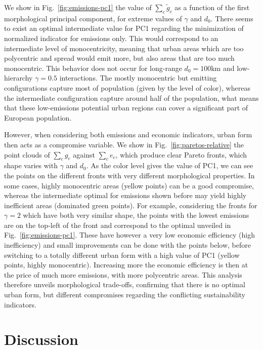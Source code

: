\documentclass{jimis-en}
\begin{document}
We show in Fig.~\ref{fig:emissions-pc1} the value of $\sum_c \tilde{g}_c$ as a function of the first morphological principal component, for extreme values of $\gamma$ and $d_0$. There seems to exist an optimal intermediate value for PC1 regarding the minimization of normalized indicator for emissions only. This would correspond to an intermediate level of monocentricity, meaning that urban areas which are too polycentric and spread would emit more, but also areas that are too much monocentric. This behavior does not occur for long-range $d_0 = 100$km and low-hierarchy $\gamma=0.5$ interactions. The mostly monocentric but emitting configurations capture most of population (given by the level of color), whereas the intermediate configuration capture around half of the population, what means that these low-emissions potential urban regions can cover a significant part of European population.


However, when considering both emissions and economic indicators, urban form then acts as a compromise variable. We show in Fig.~\ref{fig:paretos-relative} the point clouds of $\sum_c g_c$ against $\sum_c e_c$, which produce clear Pareto fronts, which shape varies with $\gamma$ and $d_0$. As the color level gives the value of PC1, we can see the points on the different fronts with very different morphological properties. In some cases, highly monocentric areas (yellow points) can be a good compromise, whereas the intermediate optimal for emissions shown before may yield highly inefficient areas (dominated green points). For example, considering the fronts for $\gamma = 2$ which have both very similar shape, the points with the lowest emissions are on the top-left of the front and correspond to the optimal unveiled in Fig.~\ref{fig:emissions-pc1}. These have however a very low economic efficiency (high inefficiency) and small improvements can be done with the points below, before switching to a totally different urban form with a high value of PC1 (yellow points, highly monocentric). Increasing more the economic efficiency is then at the price of much more emissions, with more polycentric areas. This analysis therefore unveils morphological trade-offs, confirming that there is no optimal urban form, but different compromises regarding the conflicting sustainability indicators.



\section{Discussion}
\end{document}
